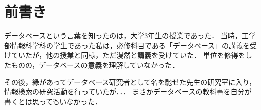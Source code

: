 \section*{前書き}
データベースという言葉を知ったのは，大学3年生の授業であった．
当時，工学部情報科学科の学生であった私は，必修科目である「データベース」の講義を受けていたが，他の授業と同様，ただ漫然と講義を受けていた．
単位を修得をしたものの，データベースの意義を理解していなかった．

その後，縁があってデータベース研究者として名を馳せた先生の研究室に入り，情報検索の研究活動を行っていたが．．．
まさかデータベースの教科書を自分が書くとは思ってもいなかった．
